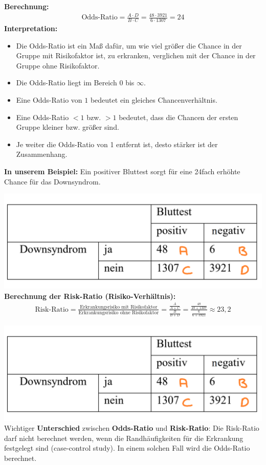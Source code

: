 \documentclass[t,11pt,aspectratio=169]{beamer}
\begin{document}
\begin{frame}
\textbf{Berechnung:}
\begin{align*}
\text{Odds-Ratio} = \frac{A\cdot D}{B \cdot C} = \frac{48\cdot 3921}{6 \cdot 1307} = 24
\end{align*}
\textbf{Interpretation:}
\begin{itemize}
\item Die Odds-Ratio ist ein Maß dafür, um wie viel größer die Chance in der Gruppe mit Risikofaktor ist, zu erkranken, verglichen mit der Chance in der Gruppe ohne Risikofaktor.
\item Die Odds-Ratio liegt im Bereich $0$ bis $\infty$.
\item Eine Odds-Ratio von $1$ bedeutet ein gleiches Chancenverhältnis.
\item Eine Odds-Ratio $<1$ bzw. $>1$ bedeutet, dass die Chancen der ersten Gruppe kleiner bzw. größer sind.
\item Je weiter die Odds-Ratio von 1 entfernt ist, desto stärker ist der Zusammenhang.
\end{itemize}
\pause
\vfill
\textbf{In unserem Beispiel:} Ein positiver Bluttest sorgt für eine 24fach erhöhte Chance für das Downsyndrom.
\end{frame}

\begin{frame}
\includegraphics[width=\textwidth]{tabelle4.png}
\vfill
\textbf{Berechnung der Risk-Ratio (Risiko-Verhältnis):}
\begin{align*}
	\text{Risk-Ratio} = \frac{\text{Erkrankungsrisiko mit Risikofaktor}}{\text{Erkrankungsrisiko ohne Risikofaktor}} =  \frac{\frac{A}{A+C}}{\frac{B}{B+D}} = \frac{\frac{48}{48+1307}}{\frac{6}{6+3921}} \approx 23,2
\end{align*}
\end{frame}

\begin{frame}
\includegraphics[width=\textwidth]{tabelle4.png}
\vfill
Wichtiger \textbf{Unterschied} zwischen \textbf{Odds-Ratio} und \textbf{Risk-Ratio}: Die Risk-Ratio darf nicht berechnet werden, wenn die Randhäufigkeiten für die Erkrankung festgelegt sind (case-control study). In einem solchen Fall wird die Odds-Ratio berechnet. 
\end{frame}
\end{document}
